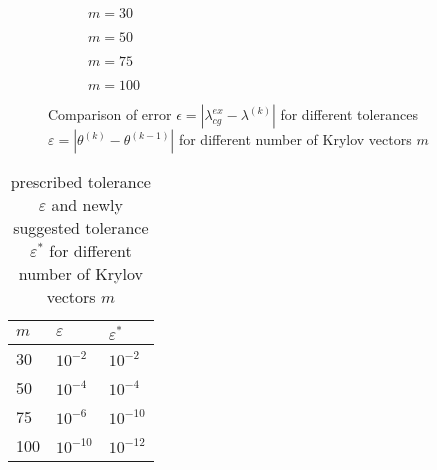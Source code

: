 \documentclass[11pt,a4paper]{article}
\begin{document}
\begin{figure}[h!]
	\centering
	\begin{subfigure}[h!]{0.5\textwidth}
		\begin{center}
			\resizebox{0.37\width}{!}{}
			\caption{$m=30$}
			\label{fig::m30}
		\end{center}	
	\end{subfigure}
	\begin{subfigure}[h!]{0.49\textwidth}
		\resizebox{0.37\width}{!}{}
		\caption{$m=50$}
		\label{fig::m50}
	\end{subfigure}
	\begin{subfigure}[h!]{0.5\textwidth}
		\begin{center}
			\resizebox{0.37\width}{!}{}
			\caption{$m=75$}
			\label{fig::m75}
		\end{center}	
	\end{subfigure}
	\begin{subfigure}[h!]{0.49\textwidth}
		\resizebox{0.37\width}{!}{}
		\caption{$m=100$}
		\label{fig::m100}
	\end{subfigure}
	\caption{\label{fig::mLanc} Comparison of error $\epsilon = |\lambda_{cg}^{ex} - \lambda^{(k)}|$ for different tolerances $\varepsilon = |\theta^{(k)} - \theta^{(k-1)}|$ for different number of Krylov vectors $m$}
\end{figure}

\renewcommand{\arraystretch}{2}
\begin{table}[h!]
	\begin{center}
		\begin{tabular}{ p{2cm} p{2cm} p{2cm}}
			\hline
			\hline
			$m$ & $\varepsilon$ & $\varepsilon^*$ \\
			\hline
			\hline
			30 &  $10^{-2}$ & $10^{-2}$\\
			\hline
			50 & $10^{-4}$ & $10^{-4}$\\
			\hline
			75 & $10^{-6}$ & $10^{-10}$\\
			\hline
			100 & $10^{-10}$ & $10^{-12}$\\
			\hline
			\hline
		\end{tabular}
		\caption{\label{tab:Tol}  prescribed tolerance $\varepsilon$ and newly suggested tolerance $\varepsilon^*$ for different number of Krylov vectors $m$}
	\end{center}
\end{table}
\renewcommand{\arraystretch}{1}
\end{document}
